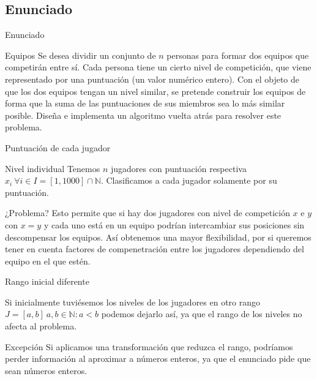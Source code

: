 \subsection{Enunciado}
\begin{frame}{Enunciado}
	\begin{block}{Equipos}
		Se desea dividir un conjunto de $n$ personas para formar dos equipos que competirán entre sí.
		Cada persona tiene un cierto nivel de competición, que viene representado por una puntuación 
		(un valor numérico entero). Con el objeto de que los dos equipos tengan un nivel similar, se
		pretende construir los equipos de forma que la suma de las puntuaciones de sus miembros sea 
		lo más similar posible. Diseña e implementa un algoritmo vuelta atrás para resolver este
		problema. 
	\end{block}
\end{frame}

\begin{frame}{Puntuación de cada jugador}
	\begin{block}{Nivel individual}
	Tenemos $n$ jugadores con puntuación respectiva $x_i\ \forall i\in I=[1, 1000]\cap \mathbb{N}$.
	Clasificamos a cada jugador solamente por su puntuación.
	\end{block}
	
	\begin{alertblock}{¿Problema?}
	Esto permite que si hay dos jugadores con nivel de competición $x$ e $y$ con $x=y$ y cada uno 
	está en un equipo podrían intercambiar sus posiciones sin descompensar los equipos.	
	Así obtenemos una mayor flexibilidad, por si queremos tener en cuenta factores de compenetración
	entre los jugadores dependiendo del equipo en el que estén.
	\end{alertblock}
\end{frame}

\begin{frame}{Rango inicial diferente}
	\begin{block}{ }
	Si inicialmente tuviésemos los niveles de los jugadores en otro rango $J=[a, b]\ a,b\in\mathbb{N}: 
	a<b$ podemos dejarlo así, ya que el rango de los niveles no afecta al problema.
	\end{block}
	
	\begin{exampleblock}{Excepción}
 	Si aplicamos una transformación que reduzca el rango, podríamos perder información al aproximar a 	
 	números	enteros, ya que el enunciado pide que sean números enteros.	
	\end{exampleblock}
\end{frame}


